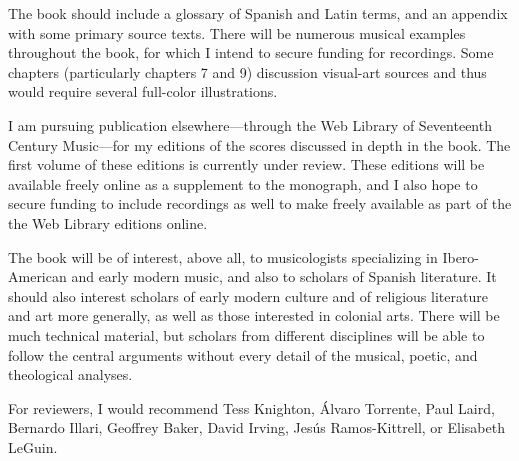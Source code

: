 \documentclass{vcbook-proposal}
\begin{document}
The book should include a glossary of Spanish and Latin terms, and an appendix with some primary source texts.
There will be numerous musical examples throughout the book, for which I intend to secure funding for recordings.
Some chapters (particularly chapters 7 and 9) discussion visual-art sources and thus would require several full-color illustrations.

I am pursuing publication elsewhere---through the Web Library of Seventeenth Century Music---for my editions of the scores discussed in depth in the book. 
The first volume of these editions is currently under review.
These editions will be available freely online as a supplement to the monograph, and I also hope to secure funding to include recordings as well to make freely available as part of the the Web Library editions online.

The book will be of interest, above all, to musicologists specializing in Ibero-American and early modern music, and also to scholars of Spanish literature.
It should also interest scholars of early modern culture and of religious literature and art more generally, as well as those interested in colonial arts.
There will be much technical material, but scholars from different disciplines will be able to follow the central arguments without every detail of the musical, poetic, and theological analyses.

For reviewers, I would recommend Tess Knighton, Álvaro Torrente, Paul Laird, Bernardo Illari, Geoffrey Baker, David Irving, Jesús Ramos-Kittrell, or Elisabeth LeGuin.

\printbibliography
\end{document}
